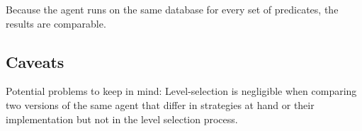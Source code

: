 Because the agent runs on the same database for every set of predicates, the results are comparable.

\subsection{Caveats}\label{subsec:experimental-caveats}
Potential problems to keep in mind: Level-selection is negligible when comparing two versions of the same agent that differ in strategies at hand or their implementation but not in the level selection process.
%

%

%



